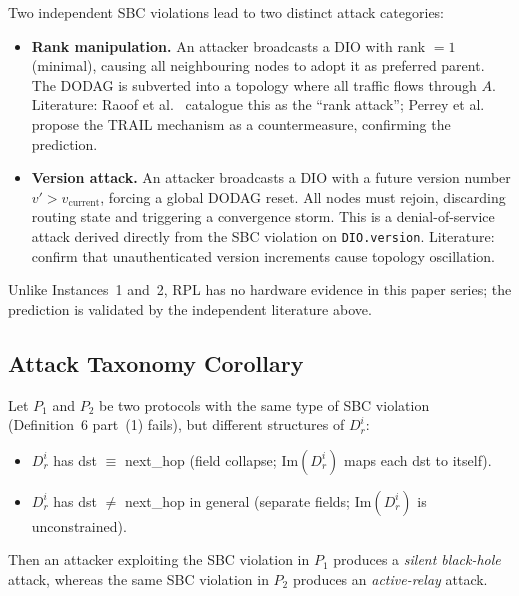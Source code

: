 Two independent SBC violations lead to two distinct attack categories:

\begin{itemize}
  \item \textbf{Rank manipulation.}\;
    An attacker broadcasts a DIO with rank $= 1$ (minimal),
    causing all neighbouring nodes to adopt it as preferred parent.
    The DODAG is subverted into a topology where all traffic flows through $A$.
    Literature: Raoof et al.~\cite{raoof2019rpl} catalogue this as the
    ``rank attack''; Perrey et al.~\cite{perrey2016trail} propose the TRAIL
    mechanism as a countermeasure, confirming the prediction.

  \item \textbf{Version attack.}\;
    An attacker broadcasts a DIO with a future version number $v' > v_{\mathrm{current}}$,
    forcing a global DODAG reset.
    All nodes must rejoin, discarding routing state and triggering a
    convergence storm.
    This is a denial-of-service attack derived directly from the SBC
    violation on \texttt{DIO.version}.
    Literature: \cite{raoof2019rpl,dvir2011vera} confirm that unauthenticated
    version increments cause topology oscillation.
\end{itemize}

Unlike Instances~1 and~2, RPL has no hardware evidence in this paper series;
the prediction is validated by the independent literature above.

\subsection{Attack Taxonomy Corollary}
\label{sec:taxonomy-corollary}

\begin{corollary}
\label{cor:taxonomy}
Let $P_{1}$ and $P_{2}$ be two protocols with the same type of SBC violation
(Definition~6 part~(1) fails), but different structures of $D_{r}^{i}$:
\begin{itemize}
  \item[$P_{1}$:] $D_{r}^{i}$ has dst $\equiv$ next\_hop
    (field collapse; $\mathrm{Im}(D_{r}^{i})$ maps each dst to itself).
  \item[$P_{2}$:] $D_{r}^{i}$ has dst $\neq$ next\_hop in general
    (separate fields; $\mathrm{Im}(D_{r}^{i})$ is unconstrained).
\end{itemize}
Then an attacker exploiting the SBC violation in $P_{1}$ produces a
\emph{silent black-hole} attack, whereas the same SBC violation in $P_{2}$
produces an \emph{active-relay} attack.
\end{corollary}

